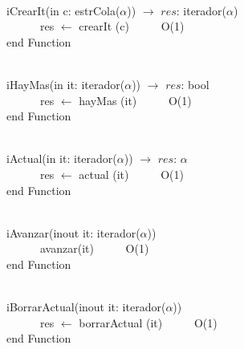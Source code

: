 \documentclass[a4paper,10pt]{article}
\begin{document}
\begin{algoritmo}
\caption{}\\
  iCrearIt(in c: estrCola($\alpha$)) $\rightarrow$ $res$: iterador($\alpha$) \\
	\indent \ \ \ \ \ \  res $\gets$ crearIt (c)  \ \ \ \ \ O(1)\\
   end Function 
\end{algoritmo}

\begin{algoritmo}
\caption{}\\
 iHayMas(in it: iterador($\alpha$)) $\rightarrow$ $res$: bool \ \ \ \ \ \\
	\indent \ \ \ \ \ \  res $\gets$ hayMas (it)  \ \ \ \ \ O(1)\\
   end Function 
\end{algoritmo}

\newpage
\begin{algoritmo}
\caption{}\\
 iActual(in it: iterador($\alpha$)) $\rightarrow$ $res$: $\alpha$ \ \ \ \ \ \\
	\indent \ \ \ \ \ \  res $\gets$ actual (it)  \ \ \ \ \ O(1)\\
   end Function 
\end{algoritmo}

\begin{algoritmo}
\caption{}\\
 iAvanzar(inout it: iterador($\alpha$)) \ \ \ \ \ \\
	\indent \ \ \ \ \ \  avanzar(it) \ \ \ \ \ O(1)\\
   end Function 
\end{algoritmo}

\begin{algoritmo}
\caption{}\\
 iBorrarActual(inout it: iterador($\alpha$)) \ \ \ \ \ \\
	\indent \ \ \ \ \ \  res $\gets$ borrarActual (it)  \ \ \ \ \ O(1)\\
   end Function 
\end{algoritmo}
\end{document}
